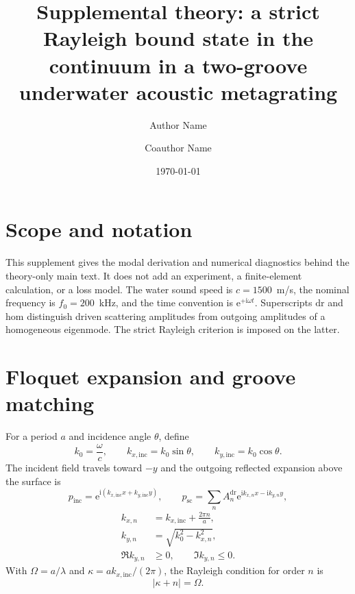 \documentclass[aps,prl,reprint,superscriptaddress,nofootinbib,floatfix]{revtex4-2}
\newcommand{\ii}{\mathrm{i}}
\newcommand{\e}{\mathrm{e}}
\providecommand{\dr}{\mathrm{dr}}
\providecommand{\hom}{\mathrm{hom}}
\providecommand{\inc}{\mathrm{inc}}
\begin{document}
\title{Supplemental theory: a strict Rayleigh bound state in the continuum in a two-groove underwater acoustic metagrating}
\author{Author Name}
\author{Coauthor Name}
\date{\today}
\maketitle

\section{Scope and notation}
\label{sec:s-scope}

This supplement gives the modal derivation and numerical diagnostics behind
the theory-only main text.  It does not add an experiment, a finite-element
calculation, or a loss model.  The water sound speed is $c=1500$~m/s, the
nominal frequency is $f_0=200$~kHz, and the time convention is
$\e^{+\ii\omega t}$.  Superscripts $\dr$ and $\hom$ distinguish driven
scattering amplitudes from outgoing amplitudes of a homogeneous eigenmode.
The strict Rayleigh criterion is imposed on the latter.

\section{Floquet expansion and groove matching}
\label{sec:s-floquet}

For a period $a$ and incidence angle $\theta$, define
\begin{equation}
 k_0=\frac{\omega}{c},\qquad k_{x,\inc}=k_0\sin\theta,
 \qquad k_{y,\inc}=k_0\cos\theta .
 \label{eq:s-wavenumbers}
\end{equation}
The incident field travels toward $-y$ and the outgoing reflected expansion
above the surface is
\begin{equation}
 p_{\inc}=\e^{\ii(k_{x,\inc}x+k_{y,\inc}y)},
 \qquad
 p_{\mathrm{sc}}=\sum_n A_n^{\dr}\e^{\ii k_{x,n}x-\ii k_{y,n}y},
 \label{eq:s-exterior}
\end{equation}
\begin{equation}
\begin{aligned}
 k_{x,n}&=k_{x,\inc}+\frac{2\pi n}{a},\\
 k_{y,n}&=\sqrt{k_0^2-k_{x,n}^2},\\
 \Re k_{y,n}&\geq0,\qquad \Im k_{y,n}\leq0 .
\end{aligned}
 \label{eq:s-floquet}
\end{equation}
With $\Omega=a/\lambda$ and $\kappa=a k_{x,\inc}/(2\pi)$, the Rayleigh
condition for order $n$ is
\begin{equation}
 |\kappa+n|=\Omega .
 \label{eq:s-ra}
\end{equation}
\end{document}
